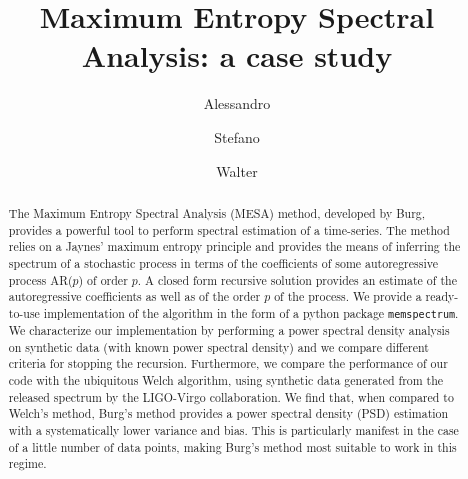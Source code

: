 \documentclass[twocolumn,showpacs,preprintnumbers,nofootinbib,prd,
superscriptaddress,10pt]{revtex4-1}
\begin{document}
\begin{abstract}
The Maximum Entropy Spectral Analysis (MESA) method, developed by Burg, provides a powerful tool to perform spectral estimation of a time-series. The method relies on a Jaynes' maximum entropy principle and provides the means of inferring the spectrum of a stochastic process in terms of the coefficients of some autoregressive process AR($p$) of order $p$.
A closed form recursive solution provides an estimate of the autoregressive coefficients as well as of the order $p$ of the process.
We provide a ready-to-use implementation of the algorithm in the form of a python package \texttt{memspectrum}. We characterize our implementation by performing a power spectral density analysis on synthetic data (with known power spectral density) and we compare different criteria for stopping the recursion. Furthermore, we compare the performance of our code with the ubiquitous Welch algorithm, using synthetic data generated from the released spectrum by the LIGO-Virgo collaboration.
We find that, when compared to Welch's method, Burg's method provides a power spectral density (PSD) estimation with a 
systematically lower variance and bias. This is particularly manifest in the case of a little number of data points, making Burg's method most suitable to work in this regime.

\end{abstract}
	
	\title{Maximum Entropy Spectral Analysis: a case study}
	\author{Alessandro }
	\author{Stefano }
	\author{Walter }
  
	
	\maketitle

\end{document}
